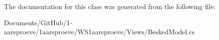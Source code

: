 The documentation for this class was generated from the following file\+:\begin{DoxyCompactItemize}
\item 
Documents/\+Git\+Hub/1-\/aarsproeve/1aarsproeve/\+W\+S1aarsproeve/\+Views/Besked\+Model.\+cs\end{DoxyCompactItemize}
